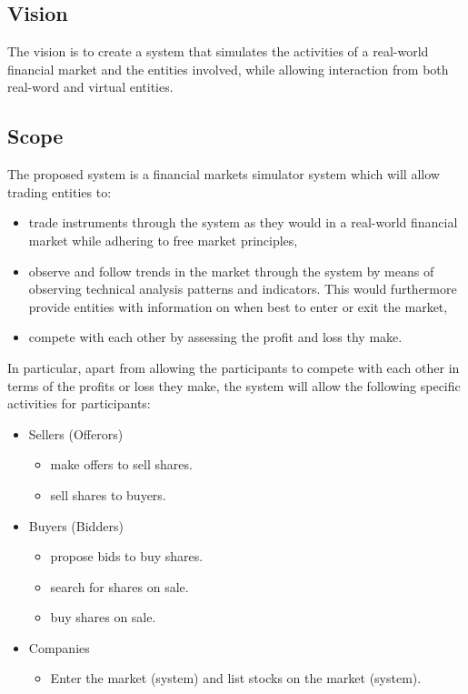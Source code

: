 \documentclass[12pt]{article}
\begin{document}
		\subsection{Vision}
		The vision is to create a system that simulates the activities of a real-world financial market and the entities involved, while allowing interaction from both real-word and virtual entities.
		
		\subsection{Scope}
		The proposed system is a financial markets simulator system which will allow trading entities to:
		\begin{itemize}
		\item trade instruments through the system as they would in a real-world financial market while adhering to free market principles,
		\item observe and follow trends in the market through the system by means of observing technical analysis patterns and indicators. This would furthermore provide entities with information on when best to enter or exit the market,
		\item compete with each other by assessing the profit and loss thy make.
		\end{itemize}
		
		In particular, apart from allowing the participants to compete with each other in terms of the profits or loss they make, the system will allow the following specific activities for participants:
		
		\begin{itemize}
		\item Sellers (Offerors)
			\begin{itemize}
			\item make offers to sell shares.
			\item sell shares to buyers.
			\end{itemize}
		\item Buyers (Bidders)
			\begin{itemize}
			\item propose bids to buy shares.
			\item search for shares on sale.
			\item buy shares on sale.
			\end{itemize}
		\item Companies
			\begin{itemize}
			\item Enter the market (system) and list stocks on the market (system).
			\end{itemize}
		
		\end{itemize}
\end{document}
